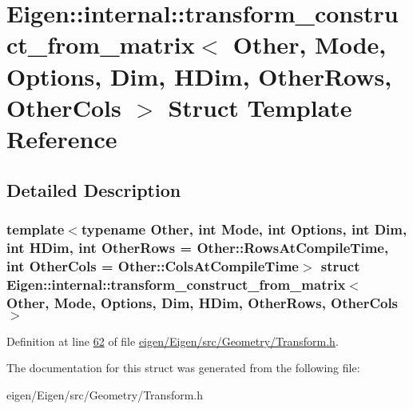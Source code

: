 \hypertarget{struct_eigen_1_1internal_1_1transform__construct__from__matrix}{}\section{Eigen\+:\+:internal\+:\+:transform\+\_\+construct\+\_\+from\+\_\+matrix$<$ Other, Mode, Options, Dim, H\+Dim, Other\+Rows, Other\+Cols $>$ Struct Template Reference}
\label{struct_eigen_1_1internal_1_1transform__construct__from__matrix}


\subsection{Detailed Description}
\subsubsection*{template$<$typename Other, int Mode, int Options, int Dim, int H\+Dim, int Other\+Rows = Other\+::\+Rows\+At\+Compile\+Time, int Other\+Cols = Other\+::\+Cols\+At\+Compile\+Time$>$\newline
struct Eigen\+::internal\+::transform\+\_\+construct\+\_\+from\+\_\+matrix$<$ Other, Mode, Options, Dim, H\+Dim, Other\+Rows, Other\+Cols $>$}



Definition at line \hyperlink{eigen_2_eigen_2src_2_geometry_2_transform_8h_source_l00062}{62} of file \hyperlink{eigen_2_eigen_2src_2_geometry_2_transform_8h_source}{eigen/\+Eigen/src/\+Geometry/\+Transform.\+h}.



The documentation for this struct was generated from the following file\+:\begin{DoxyCompactItemize}
\item 
eigen/\+Eigen/src/\+Geometry/\+Transform.\+h\end{DoxyCompactItemize}

